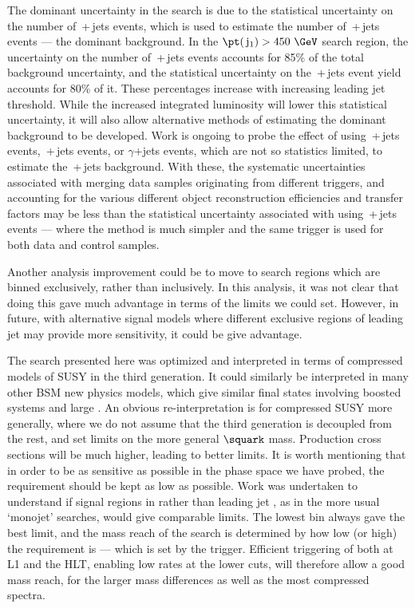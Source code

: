 The dominant uncertainty in the search is due to the statistical uncertainty on the number of \zmumubr{}\,+\,jets events, which is used to estimate the number of \znunubr{}\,+\,jets events --- the dominant background. 
In the $\pt(\,\mathrm{j}_1)>450~\GeV$ search region, the uncertainty on the number of \znunubr{}\,+\,jets events accounts for 85\% of the total background uncertainty, and the statistical uncertainty on the \zmumubr{}\,+\,jets event yield accounts for 80\% of it. These percentages increase with increasing leading jet threshold.
While the increased integrated luminosity will lower this statistical uncertainty, it will also allow alternative methods of estimating the dominant background to be developed.
Work is ongoing to probe the effect of using \wmunubr\,+\,jets events, \wenubr\,+\,jets events, or $\gamma$+jets events, which are not so statistics limited, to estimate the \znunubr{}\,+\,jets background. 
With these, the systematic uncertainties associated with merging data samples originating from different triggers, and accounting for the various different object reconstruction efficiencies and transfer factors may be less than the statistical uncertainty associated with using \zmumubr{}\,+\,jets events --- where the method is much simpler and the same trigger is used for both data and control samples. 

Another analysis improvement could be to move to search regions which are binned exclusively, rather than inclusively. 
In this analysis, it was not clear that doing this gave much advantage in terms of the limits we could set. 
However, in future, with alternative signal models where different exclusive regions of leading jet \pt may provide more sensitivity, it could be give advantage.

The search presented here was optimized and interpreted in terms of compressed models of \ac{SUSY} in the third generation. 
It could similarly be interpreted in many other \ac{BSM} new physics models, which give similar final states involving boosted systems and large \MET. 
An obvious re-interpretation is for compressed \ac{SUSY} more generally, where we do not assume that the third generation is decoupled from the rest, and set limits on the more general $\squark$ mass. 
Production cross sections will be much higher, leading to better limits. 
It is worth mentioning that in order to be as sensitive as possible in the phase space we have probed, the \MET requirement should be kept as low as possible. 
Work was undertaken to understand if signal regions in \MET rather than leading jet \pt, as in the more usual `monojet' searches, would give comparable limits. 
The lowest \MET bin always gave the best limit, and the mass reach of the search is determined by how low (or high) the \MET requirement is --- which is set by the trigger. 
Efficient triggering of \MET both at \ac{L1} and the \ac{HLT}, enabling low rates at the lower \MET cuts, will therefore allow a good mass reach, for the larger mass differences as well as the most compressed spectra. 



